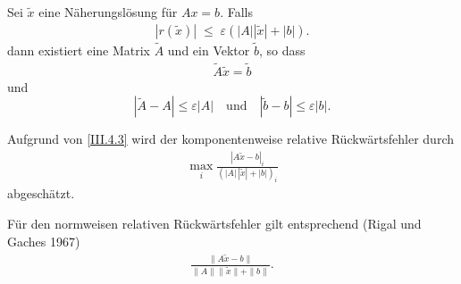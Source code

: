 \begin{Satze}\label{3.4.1}
  Sei $\tilde{ x}$ eine Näherungslösung für 
  $  A  x =  b$. 
  Falls
  \begin{gather}\label{III.4.3}
    |  r(\tilde { x})|  \; \leq \; \varepsilon ( | A| | \tilde { x} | + |  b|).
  \end{gather}
  dann existiert eine Matrix $\tilde{ A}$  und ein
  Vektor $\tilde { b}$, so dass
  \begin{gather*}
    \tilde{ A} \tilde { x}  =  \tilde{ b} 
  \end{gather*}
  und
  \begin{equation}
    |\tilde{ A} -  A |  \leq  \varepsilon | A|
    \quad \textrm{und} \quad | \tilde{ b} -  b| \leq
    \varepsilon | b|.
    \label{III.4.4}
  \end{equation}
  
  Aufgrund von \eqref{III.4.3} wird der komponentenweise relative
  Rückwärtsfehler durch 
  \begin{gather*}
    \max_i \frac{|  A \tilde{ x} -  b|_i}
    { (| A|\, |\tilde{ x}| + | b|)_i} 
  \end{gather*}
  abgeschätzt.
  
  Für den normweisen relativen Rückwärtsfehler gilt entsprechend
  (Rigal und Gaches 1967)
  \begin{gather*}
    \frac{\|  A \tilde{ x} -  b\|}
    { \| A\| \|\tilde{ x} \| + \| b\| } .
  \end{gather*}
\end{Satze}

